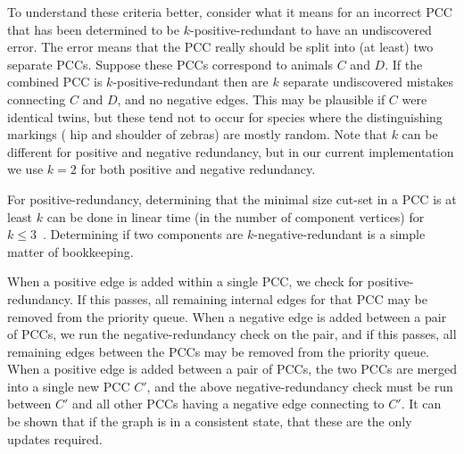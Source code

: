 To understand these criteria better, consider what it means for an incorrect
  PCC that has been determined to be $k$-positive-redundant to have an
  undiscovered error.
The error means that the PCC really should be split into (at least) two
  separate PCCs.
Suppose these PCCs correspond to animals $C$ and $D$.
If the combined PCC is $k$-positive-redundant then are $k$ separate
  undiscovered mistakes connecting $C$ and $D$, and no negative edges.
This may be plausible if $C$ were identical twins, but these tend not to occur
  for species where the distinguishing markings (\eg{} hip and shoulder of
  zebras) are mostly random.
Note that $k$ can be different for positive and negative redundancy, but in
  our current implementation we use $k=2$ for both positive and negative
  redundancy.

For positive-redundancy, determining that the minimal size cut-set in a PCC is
  at least $k$ can be done in linear time (in the number of component vertices)
  for $k \leq 3$~\cite{wang_simple_2015}.
Determining if two components are $k$-negative-redundant is a simple matter of
  bookkeeping.


  \kredun{}
%


When a positive edge is added within a single PCC, we check for
  positive-redundancy.
If this passes, all remaining internal edges for that PCC may be  removed from
  the priority queue.
When a negative edge is added between a pair of PCCs, we run the
  negative-redundancy check on the pair, and if this passes, all remaining edges
  between the PCCs may be removed from the priority queue.
When a positive edge is added between a pair of PCCs, the two PCCs are merged
  into a single new PCC $C'$, and the above negative-redundancy check must be
  run between $C'$ and all other PCCs having a negative edge connecting to $C'$.
It can be shown that if the graph is in a consistent state, that these are the
  only updates required.

